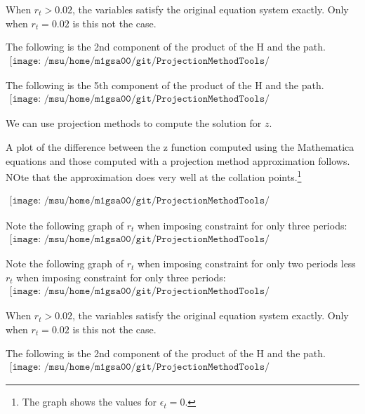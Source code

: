 \documentclass[12pt]{article}
\begin{document}
When $r_t>0.02$, the variables satisfy the original equation system exactly.
Only when $r_t=0.02$ is this not the case.


The following is the 2nd component of the product of the H and the path.
\begin{gather*}
\texttt{[image: /msu/home/m1gsa00/git/ProjectionMethodTools/ProjectionMethodToolsJava/code/prettyhapp02A.pdf]}
\end{gather*}

The following is the 5th component of the product of the H and the path.
\begin{gather*}
\texttt{[image: /msu/home/m1gsa00/git/ProjectionMethodTools/ProjectionMethodToolsJava/code/prettyhapp02B.pdf]}
\end{gather*}


We can use projection methods to compute the solution for $z$.

A plot of the difference between the z function computed using the Mathematica equations and those computed with a projection method approximation follows. NOte that the approximation does very well at the collation points.\footnote{The graph shows the values for $\epsilon_t=0$.}


\begin{gather*}
\texttt{[image: /msu/home/m1gsa00/git/ProjectionMethodTools/ProjectionMethodToolsJava/code/prettyNumDiff02.pdf]}
\end{gather*}




Note the following graph of $r_t$ when imposing constraint for only three
 periods:
\begin{gather*}
\texttt{[image: /msu/home/m1gsa00/git/ProjectionMethodTools/ProjectionMethodToolsJava/code/prettyrr03.pdf]}
\end{gather*}



Note the following graph of $r_t$ when imposing constraint for only two periods
less $r_t$ when imposing constraint for only three periods:
\begin{gather*}
\texttt{[image: /msu/home/m1gsa00/git/ProjectionMethodTools/ProjectionMethodToolsJava/code/prettyrr02lessrr03.pdf]}
\end{gather*}


When $r_t>0.02$, the variables satisfy the original equation system exactly.
Only when $r_t=0.02$ is this not the case.


The following is the 2nd component of the product of the H and the path.
\begin{gather*}
\texttt{[image: /msu/home/m1gsa00/git/ProjectionMethodTools/ProjectionMethodToolsJava/code/prettyhapp03A.pdf]}
\end{gather*}
\end{document}
